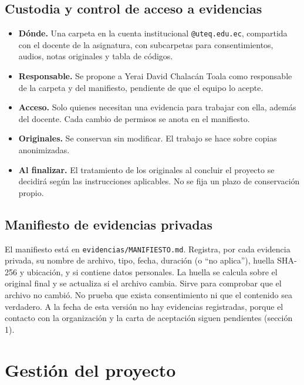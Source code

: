 \documentclass[11pt,a4paper]{article}
\begin{document}
\subsection{Custodia y control de acceso a evidencias}

\begin{itemize}

    \item \textbf{Dónde.} Una carpeta en la cuenta institucional \texttt{@uteq.edu.ec}, compartida con el docente de la asignatura, con subcarpetas para consentimientos, audios, notas originales y tabla de códigos.

    \item \textbf{Responsable.} Se propone a Yerai David Chalacán Toala como responsable de la carpeta y del manifiesto, pendiente de que el equipo lo acepte.

    \item \textbf{Acceso.} Solo quienes necesitan una evidencia para trabajar con ella, además del docente. Cada cambio de permisos se anota en el manifiesto.

    \item \textbf{Originales.} Se conservan sin modificar. El trabajo se hace sobre copias anonimizadas.

    \item \textbf{Al finalizar.} El tratamiento de los originales al concluir el proyecto se decidirá según las instrucciones aplicables. No se fija un plazo de conservación propio.

\end{itemize}

\subsection{Manifiesto de evidencias privadas}

El manifiesto está en \texttt{evidencias/MANIFIESTO.md}. Registra, por cada evidencia privada, su nombre de archivo, tipo, fecha, duración (o \enquote{no aplica}), huella SHA-256 y ubicación, y si contiene datos personales. La huella se calcula sobre el original final y se actualiza si el archivo cambia. Sirve para comprobar que el archivo no cambió. No prueba que exista consentimiento ni que el contenido sea verdadero. A la fecha de esta versión no hay evidencias registradas, porque el contacto con la organización y la carta de aceptación siguen pendientes (sección 1).

\section{Gestión del proyecto}
\end{document}
